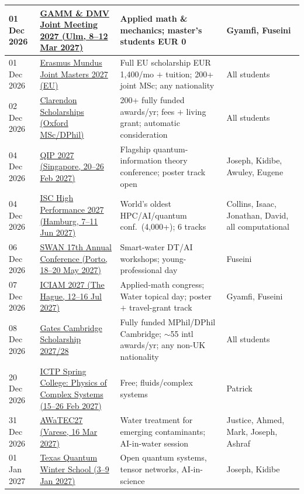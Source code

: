 \begin{longtable}{@{}p{2.0cm}p{4.4cm}p{5.2cm}p{3.0cm}@{}}
\midrule
01 Dec 2026 & \href{https://jahrestagung.gamm.org/joint-annual-meeting-2027/}{GAMM \& DMV Joint Meeting 2027 (Ulm, 8--12 Mar 2027)} & Applied math \& mechanics; master's students EUR 0 & Gyamfi, Fuseini  \\
\midrule
01 Dec 2026 & \href{https://erasmus-plus.ec.europa.eu/opportunities/individuals/students/erasmus-mundus-joint-masters}{Erasmus Mundus Joint Masters 2027 (EU)} & Full EU scholarship EUR 1{,}400/mo $+$ tuition; 200+ joint MSc; any nationality & All students  \\
\midrule
02 Dec 2026 & \href{https://www.ox.ac.uk/admissions/graduate/fees-and-funding/funding/clarendon}{Clarendon Scholarships (Oxford MSc/DPhil)} & 200+ fully funded awards/yr; fees $+$ living grant; automatic consideration & All students  \\
\midrule
04 Dec 2026 & \href{https://qipconference.org/2027/call/}{QIP 2027 (Singapore, 20--26 Feb 2027)} & Flagship quantum-information theory conference; poster track open & Joseph, Kidibe, Awuley, Eugene  \\
\midrule
04 Dec 2026 & \href{https://isc-hpc.com/}{ISC High Performance 2027 (Hamburg, 7--11 Jun 2027)} & World's oldest HPC/AI/quantum conf.\ (4{,}000+); 6 tracks & Collins, Isaac, Jonathan, David, all computational  \\
\midrule
06 Dec 2026 & \href{https://swan-forum.com/events/swan-2027}{SWAN 17th Annual Conference (Porto, 18--20 May 2027)} & Smart-water DT/AI workshops; young-professional day & Fuseini  \\
\midrule
07 Dec 2026 & \href{https://iciam2027.org/}{ICIAM 2027 (The Hague, 12--16 Jul 2027)} & Applied-math congress; Water topical day; poster $+$ travel-grant track & Gyamfi, Fuseini  \\
\midrule
08 Dec 2026 & \href{https://www.gatescambridge.org/apply/timeline/}{Gates Cambridge Scholarship 2027/28} & Fully funded MPhil/DPhil Cambridge; $\sim$55 intl awards/yr; any non-UK nationality & All students  \\
\midrule
20 Dec 2026 & \href{https://www.ictp.it/home/scientific-calendar}{ICTP Spring College: Physics of Complex Systems (15--26 Feb 2027)} & Free; fluids/complex systems & Patrick  \\
\midrule
31 Dec 2026 & \href{https://awatec27.dista.uninsubria.it/}{AWaTEC27 (Varese, 16 Mar 2027)} & Water treatment for emerging contaminants; AI-in-water session & Justice, Ahmed, Mark, Joseph, Ashraf  \\
\midrule
01 Jan 2027 & \href{https://www.texquantum.com/index.html}{Texas Quantum Winter School (3--9 Jan 2027)} & Open quantum systems, tensor networks, AI-in-science & Joseph, Kidibe  \\

\end{longtable}
